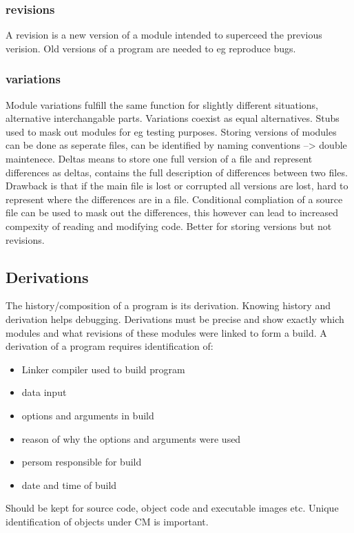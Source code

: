 \documentclass{article}
\begin{document}
    \subsubsection{revisions}
    A revision is a new version of a module intended to superceed the previous verision. Old versions of a program are needed to eg reproduce bugs.

    \subsubsection{variations}
    Module variations fulfill the same function for slightly different situations, alternative interchangable parts. Variations coexist as equal alternatives. Stubs used to mask out modules for eg testing purposes.
    Storing versions of modules can be done as seperate files, can be identified by naming conventions --> double maintenece. Deltas means to store one full version of a file and represent differences as deltas, contains the full description of differences between two files. Drawback is that if the main file is lost or corrupted all versions are lost, hard to represent where the differences are in a file.
    Conditional compliation of a source file can be used to mask out the differences, this however can lead to increased compexity of reading and modifying code. Better for storing versions but not revisions.

    \subsection{Derivations}
    The history/composition of a program is its derivation. Knowing history and derivation helps debugging. Derivations must be precise and show exactly which modules and what revisions of these modules were linked to form a build. A derivation of a program requires identification of:

    \begin{itemize}
    \item Linker compiler used to build program
    \item data input
    \item options and arguments in build
    \item reason of why the options and arguments were used
    \item persom responsible for build
    \item date and time of build
    \end{itemize}
    Should be kept for source code, object code and executable images etc.
    Unique identification of objects under CM is important.
\end{document}
